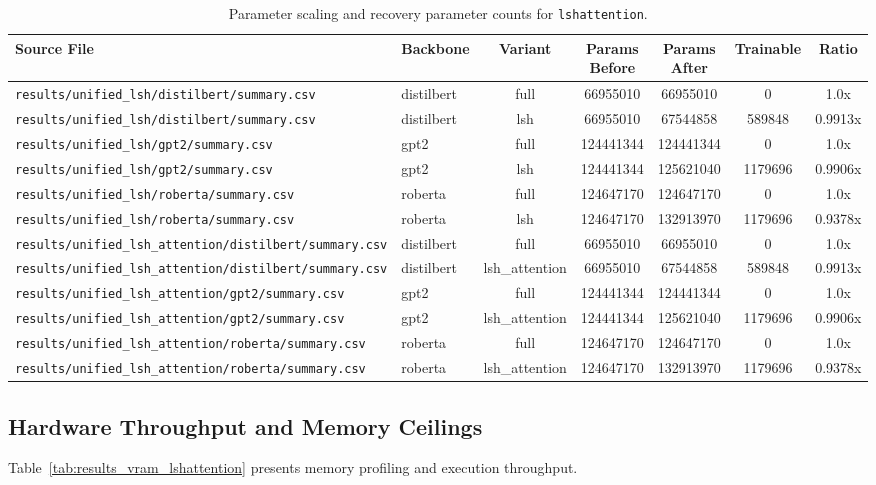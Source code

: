 \begin{table}[t]
\centering
\small
\begin{tabular}{llccccc}
\toprule
\textbf{Source File} & \textbf{Backbone} & \textbf{Variant} & \textbf{Params Before} & \textbf{Params After} & \textbf{Trainable} & \textbf{Ratio} \\
\midrule
\texttt{results/unified\_lsh/distilbert/summary.csv} & distilbert & full & 66955010 & 66955010 & 0 & 1.0x \\
\texttt{results/unified\_lsh/distilbert/summary.csv} & distilbert & lsh & 66955010 & 67544858 & 589848 & 0.9913x \\
\texttt{results/unified\_lsh/gpt2/summary.csv} & gpt2 & full & 124441344 & 124441344 & 0 & 1.0x \\
\texttt{results/unified\_lsh/gpt2/summary.csv} & gpt2 & lsh & 124441344 & 125621040 & 1179696 & 0.9906x \\
\texttt{results/unified\_lsh/roberta/summary.csv} & roberta & full & 124647170 & 124647170 & 0 & 1.0x \\
\texttt{results/unified\_lsh/roberta/summary.csv} & roberta & lsh & 124647170 & 132913970 & 1179696 & 0.9378x \\
\texttt{results/unified\_lsh\_attention/distilbert/summary.csv} & distilbert & full & 66955010 & 66955010 & 0 & 1.0x \\
\texttt{results/unified\_lsh\_attention/distilbert/summary.csv} & distilbert & lsh\_attention & 66955010 & 67544858 & 589848 & 0.9913x \\
\texttt{results/unified\_lsh\_attention/gpt2/summary.csv} & gpt2 & full & 124441344 & 124441344 & 0 & 1.0x \\
\texttt{results/unified\_lsh\_attention/gpt2/summary.csv} & gpt2 & lsh\_attention & 124441344 & 125621040 & 1179696 & 0.9906x \\
\texttt{results/unified\_lsh\_attention/roberta/summary.csv} & roberta & full & 124647170 & 124647170 & 0 & 1.0x \\
\texttt{results/unified\_lsh\_attention/roberta/summary.csv} & roberta & lsh\_attention & 124647170 & 132913970 & 1179696 & 0.9378x \\
\bottomrule
\end{tabular}
\caption{Parameter scaling and recovery parameter counts for \texttt{lshattention}.}
\label{tab:results_params_lshattention}
\end{table}

\subsection{Hardware Throughput and Memory Ceilings}
Table~\ref{tab:results_vram_lshattention} presents memory profiling and execution throughput.

